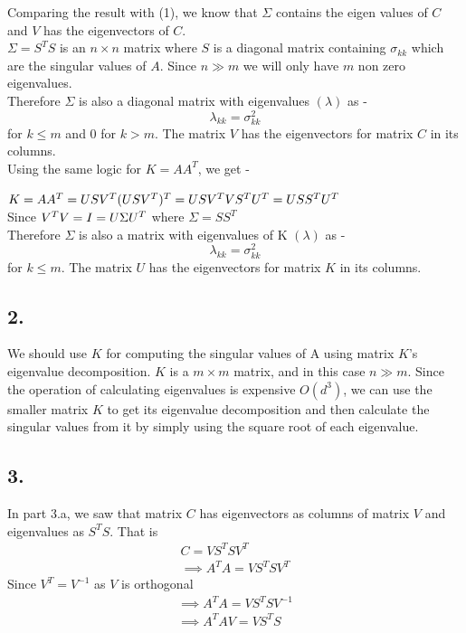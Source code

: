 \documentclass[11pt]{article}
\begin{document}
{Comparing the result with (1), we know that $\Sigma$ contains the eigen values of $C$ and $V$ has the eigenvectors of $C$.\\

$\Sigma = S^T S$ is an $n \times n$ matrix where $S$ is a diagonal matrix containing $\sigma_{kk}$ which are the singular values of $A$. Since $n \gg m$ we will only have $m$ non zero eigenvalues.\\

Therefore $\Sigma$ is also a diagonal matrix with eigenvalues $(\lambda)$ as -
$$\lambda_{kk} = \sigma_{kk}^2$$ for $k \leq m$ and 0 for $k > m$. The matrix $V$ has the eigenvectors for matrix $C$ in its columns.\\

Using the same logic for $K = AA^T$, we get -

$K = A A^T = USV^T(USV^T)^T \\
= U S V^T V S^T U^T \\
= U S S^T U^T  \hspace{30 mm}$ Since $V^T V = I\\
= U \Sigma U^T$ \hspace{30 mm} where $\Sigma = S S^T$\\

Therefore $\Sigma$ is also a matrix with eigenvalues of K $(\lambda)$ as -
$$\lambda_{kk} = \sigma_{kk}^2$$ for $k \leq m$. The matrix $U$ has the eigenvectors for matrix $K$ in its columns.\\

\pagebreak[4]
\subsection*{2.}

We should use $K$ for computing the singular values of A using matrix $K$'s eigenvalue decomposition. $K$ is a $m \times m$ matrix, and in this case $n \gg m$. Since the operation of calculating eigenvalues is expensive $O(d^3)$, we can use the smaller matrix $K$ to get its eigenvalue decomposition and then calculate the singular values from it by simply using the square root of each eigenvalue.

\pagebreak[4]
\subsection*{3.}

In part 3.a, we saw that matrix $C$ has eigenvectors as columns of matrix $V$ and eigenvalues as $S^T S$. That is
\begin{align*}
C = V S^T S V^T\\
\implies A^T A = V S^T S V^T
\end{align*}
Since $V^T = V^{-1}$ as $V$ is orthogonal
\begin{align*}
\implies A^T A = V S^T S V^{-1}\\
\implies A^T A V = V S^T S
\end{align*}

}
\end{document}

